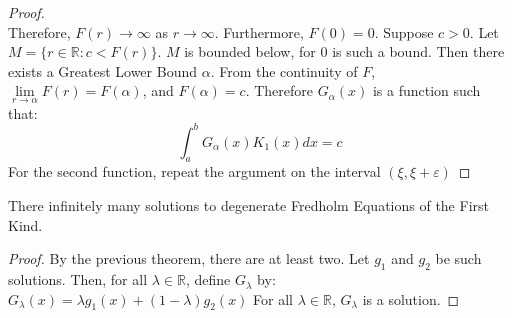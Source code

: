 \begin{proof}
\begin{subequations}
            \end{subequations}
            Therefore, $F(r)\rightarrow \infty$ as
            $r\rightarrow\infty$. Furthermore, $F(0) = 0$.
            Suppose $c>0$. Let $M=\{r\in\mathbb{R}:c<F(r)\}$.
            $M$ is bounded below, for $0$ is such a bound. Then
            there exists a Greatest Lower Bound $\alpha$. From
            the continuity of $F$,
            $\underset{r\rightarrow\alpha}{\lim}F(r)=F(\alpha)$,
            and $F(\alpha)=c$. Therefore $G_{\alpha}(x)$ is a
            function such that:
            \begin{equation*}
                \int_{a}^{b}G_{\alpha}(x)K_{1}(x)dx=c
            \end{equation*}
            For the second function, repeat the argument on the
            interval $(\xi,\xi+\varepsilon)$
        \end{proof}
        \begin{theorem}
            There infinitely many solutions to degenerate
            Fredholm Equations of the First Kind.
        \end{theorem}
        \begin{proof}
            By the previous theorem, there are at least two. Let
            $g_{1}$ and $g_{2}$ be such solutions. Then, for all
            $\lambda\in\mathbb{R}$, define $G_{\lambda}$ by:
            $G_{\lambda}(x)=\lambda g_{1}(x)+(1-\lambda)g_{2}(x)$
            For all $\lambda\in\mathbb{R}$, $G_{\lambda}$ is a
            solution.
        \end{proof}